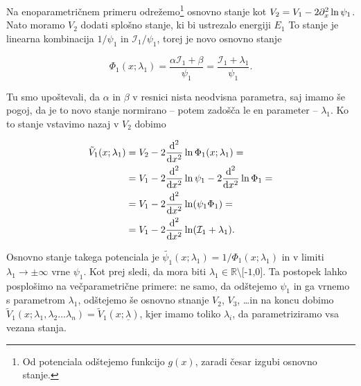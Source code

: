 Na enoparametri\v cnem primeru odre\v zemo\footnote{Od potenciala od\v stejemo funkcijo $g(x)$, zaradi \v cesar izgubi
osnovno stanje.} osnovno stanje kot $V_2 = V_1 - 2\px^2 \ln\psi_1$. Nato moramo $V_2$ dodati splo\v sno stanje, ki bi ustrezalo
energiji $E_1$ To stanje je linearna kombinacija $1/\psi_1$ in
$\mathcal{I}_1/\psi_1$, torej je novo osnovno stanje

\begin{equation}
	\Phi_1 (x;\lambda_1) = \frac{\alpha\mathcal{I}_1 + \beta}{\psi_1} = \frac{\mathcal{I}_1 + \lambda_1}{\psi_1}.
\end{equation}

\ni Tu smo upo\v stevali, da $\alpha$ in $\beta$ v resnici nista neodvisna parametra, saj imamo \v se pogoj, da je to novo stanje
normirano -- potem zado\v s\v ca le en parameter -- $\lambda_1$. Ko to stanje vstavimo nazaj v $V_2$ dobimo

\begin{align}
	\tilde{V}_1(x;\lambda_1) &= V_2 - 2\odv[2]\ln\Phi_1(x;\lambda_1) = \notag \\
		&= V_1 - 2\odv[2]\ln\psi_1 - 2\odv[2]\ln\Phi_1 = \notag \\
		&= V_1 - 2\odv[2]\ln (\psi_1 \Phi_1) = \notag \\
		&= V_1 - 2\odv[2]\ln (\mathcal{I}_1 + \lambda_1).
\end{align}

\ni Osnovno stanje takega potenciala je $\tilde{\psi_1}(x;\lambda_1) = 1/\Phi_1 (x;\lambda_1)$ in v limiti $\lambda_1 \to \pm
\infty$ vrne $\psi_1$. Kot prej sledi, da mora biti $\lambda_1 \in \mathbb{R}\text{\textbackslash [-1,0]}$. Ta postopek
lahko posplo\v simo na ve\v cparametri\v cne primere: ne samo, da od\v stejemo $\psi_1$ in ga vrnemo s parametrom $\lambda_1$,
od\v stejemo \v se osnovno stnanje $V_2$, $V_3$, \ldots in na koncu dobimo
$\tilde{V}_1 (x;\lambda_1,\lambda_2\ldots\lambda_n) = \tilde{V}_1 (x; \underline{\lambda})$, kjer imamo toliko $\lambda_i$, da
parametriziramo vsa vezana stanja.

